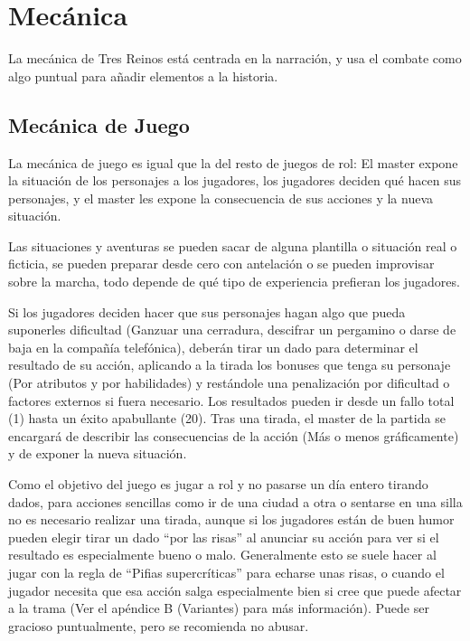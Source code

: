 \chapter{Mecánica}

La mecánica de Tres Reinos está centrada en la narración, y usa el combate como algo puntual para añadir elementos a la historia. 

\section{Mecánica de Juego}

La mecánica de juego es igual que la del resto de juegos de rol: El master expone la situación de los personajes a los jugadores, los jugadores deciden qué hacen sus personajes, y el master les expone la consecuencia de sus acciones y la nueva situación. 

Las situaciones y aventuras se pueden sacar de alguna plantilla o situación real o ficticia, se pueden preparar desde cero con antelación o se pueden improvisar sobre la marcha, todo depende de qué tipo de experiencia prefieran los jugadores. 

Si los jugadores deciden hacer que sus personajes hagan algo que pueda suponerles dificultad (Ganzuar una cerradura, descifrar un pergamino o darse de baja en la compañía telefónica), deberán tirar un dado para determinar el resultado de su acción, aplicando a la tirada los bonuses que tenga su personaje (Por atributos y por habilidades) y restándole una penalización por dificultad o factores externos si fuera necesario. Los resultados pueden ir desde un fallo total (1) hasta un éxito apabullante (20). Tras una tirada, el master de la partida se encargará de describir las consecuencias de la acción (Más o menos gráficamente) y de exponer la nueva situación. 

Como el objetivo del juego es jugar a rol y no pasarse un día entero tirando dados, para acciones sencillas como ir de una ciudad a otra o sentarse en una silla no es necesario realizar una tirada, aunque si los jugadores están de buen humor pueden elegir tirar un dado ``por las risas'' al anunciar su acción para ver si el resultado es especialmente bueno o malo. Generalmente esto se suele hacer al jugar con la regla de ``Pifias supercríticas'' para echarse unas risas, o cuando el jugador necesita que esa acción salga especialmente bien si cree que puede afectar a la trama (Ver el apéndice B (Variantes) para más información). Puede ser gracioso puntualmente, pero se recomienda no abusar.

